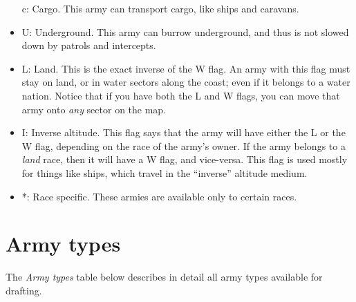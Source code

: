 \begin{itemize}
c:  Cargo.  This army can transport cargo, like ships and caravans.
\item
U:  Underground.  This army can burrow underground, and thus is not
slowed down by patrols and intercepts.
\item
L:  Land.  This is the exact inverse of the W flag.  An army with
this flag must stay on land, or in water sectors along the coast; even
if it belongs to a water nation.  Notice that if you have both the
L and W flags, you can move that army onto \emph{any} sector on the
map.
\item
I:  Inverse altitude.  This flag says that the army will have either
the L or the W flag, depending on the race of the army's owner.  If
the army belongs to a \emph{land} race, then it will have a W flag,
and vice-versa.  This flag is used mostly for things like ships,
which travel in the ``inverse'' altitude medium.
\item
*: Race specific.  These armies are available only to certain
races.
\end{itemize}

\section{Army types}

The \emph{Army types} table below describes in detail all army types
available for drafting.

